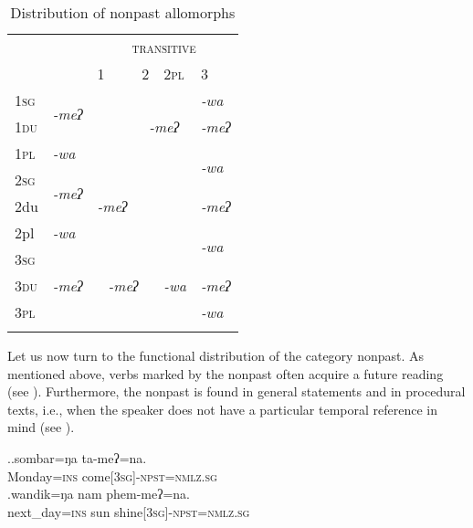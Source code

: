 \begin{table}
\begin{centering} 
\begin{tabular}{l|l|p{1.4cm}|p{1.4cm}|l|p{1.4cm}}
\lsptoprule
		& {\multirow{2}{*}{\scshape intransitive}}&	\multicolumn{4}{c}{ {\scshape transitive}}  \\
		&&	 {\scshape 1}&  {\scshape 2}&  {\scshape 2pl} &  {\scshape 3} \\
\hline

 {\scshape 1sg} 		&\multirow{2}{*}{\it -meʔ}& \cellcolor[gray]{.8}&\multicolumn{2}{c|}{}&\it -wa\\
 \cline{1-1} \cline{6-6} 		
 {\scshape 1du}		& & \cellcolor[gray]{.8}&\multicolumn{2}{c|}{\it -meʔ}&\it -meʔ\\
 \cline{1-2} \cline{6-6} 			
 {\scshape 1pl}		&\it -wa & \cellcolor[gray]{.8}&\multicolumn{2}{c|}{}&\multirow{2}{*}{\it -wa}\\
 \cline{1-5}				
 {\scshape 2sg} 		&\multirow{2}{*}{\it -meʔ}&&\multicolumn{2}{c|}{\cellcolor[gray]{.8}} &\\
 \cline{1-1} \cline{6-6}			
 {\sc2du}		& &\it -meʔ& \multicolumn{2}{c|}{\cellcolor[gray]{.8}}  &\it -meʔ\\
 \cline{1-2} \cline{6-6}			
 {\sc2pl}		&\emph{-wa}&&\multicolumn{2}{c|}{\cellcolor[gray]{.8}}  &\multirow{2}{*}{\it -wa}\\
 \cline{1-5}				
 {\scshape 3sg} 		&&\multicolumn{2}{c|}{} &  &\\
  \cline{1-1}  \cline{6-6}					
 {\scshape 3du}&\it -meʔ&\multicolumn{2}{c|}{\it -meʔ}  & \it -wa&\it -meʔ\\
 \cline{1-1} \cline{6-6}
 {\scshape 3pl}& &\multicolumn{2}{c|}{}&  &\it -wa\\
\lspbottomrule
\end{tabular}
\caption{Distribution of nonpast allomorphs}\label{par-npst-allo}
\end{centering}
\end{table}

Let us now turn to the functional distribution of the category nonpast. As mentioned above, verbs marked by the nonpast  often acquire a future reading (see \Next).  Furthermore, the nonpast is  found in general statements and in procedural texts, i.e., when the speaker does not have a particular temporal reference in mind (see \NNext). 

\ex.\ag.sombar=ŋa ta-meʔ=na.\\
Monday{\scshape =ins} come{\scshape [3sg]-npst=nmlz.sg}\\
\bg.wandik=ŋa nam phem-meʔ=na.\\
next\_day{\scshape =ins} sun shine{\scshape [3sg]-npst=nmlz.sg}\\


